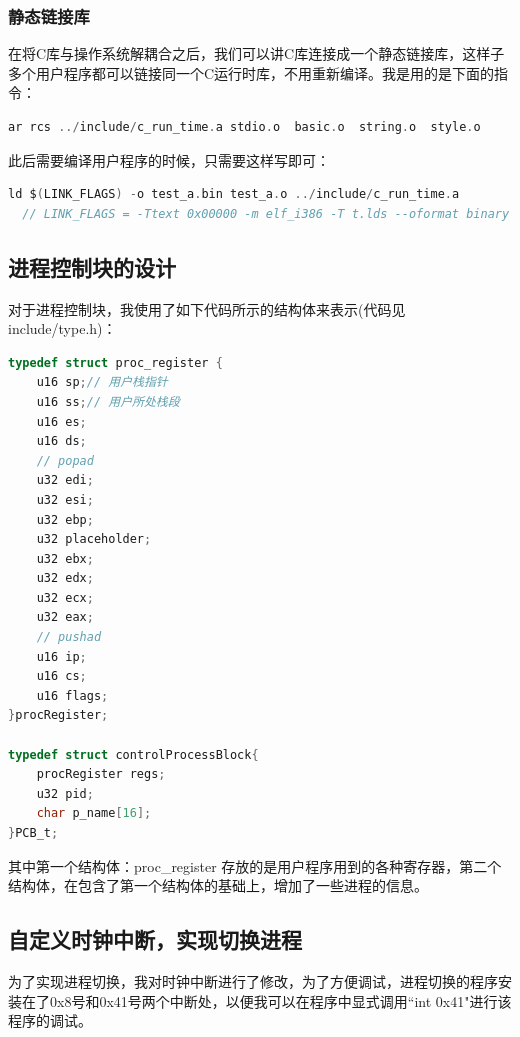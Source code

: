 \documentclass[forprint]{WHUBachelor}
\begin{document}
\subsubsection{静态链接库}

在将C库与操作系统解耦合之后，我们可以讲C库连接成一个静态链接库，这样子多个用户程序都可以链接同一个C运行时库，不用重新编译。我是用的是下面的指令：

\begin{lstlisting}[language=c]
	ar rcs ../include/c_run_time.a stdio.o  basic.o  string.o  style.o
\end{lstlisting}

此后需要编译用户程序的时候，只需要这样写即可：

\begin{lstlisting}[language=c]
  ld $(LINK_FLAGS) -o test_a.bin test_a.o ../include/c_run_time.a
  // LINK_FLAGS = -Ttext 0x00000 -m elf_i386 -T t.lds --oformat binary
\end{lstlisting}


\subsection{进程控制块的设计}

对于进程控制块，我使用了如下代码所示的结构体来表示(代码见include/type.h)：

\begin{lstlisting}[language=c]
  typedef struct proc_register {
    u16 sp;// 用户栈指针
    u16 ss;// 用户所处栈段
    u16 es;
    u16 ds;
    // popad
    u32 edi;
    u32 esi;
    u32 ebp;
    u32 placeholder; 
    u32 ebx;
    u32 edx;
    u32 ecx;
    u32 eax;
    // pushad
    u16 ip;
    u16 cs;
    u16 flags;
}procRegister;

typedef struct controlProcessBlock{
    procRegister regs;
    u32 pid;
    char p_name[16];
}PCB_t;

\end{lstlisting}
其中第一个结构体：proc\_register 存放的是用户程序用到的各种寄存器，第二个结构体，在包含了第一个结构体的基础上，增加了一些进程的信息。


\subsection{自定义时钟中断，实现切换进程}

为了实现进程切换，我对时钟中断进行了修改，为了方便调试，进程切换的程序安装在了0x8号和0x41号两个中断处，以便我可以在程序中显式调用“int 0x41"进行该程序的调试。
\end{document}
